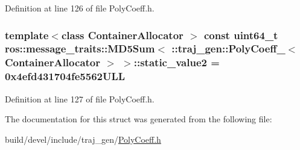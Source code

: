 Definition at line 126 of file Poly\+Coeff.\+h.

\subsubsection[{\texorpdfstring{static\+\_\+value2}{static_value2}}]{\setlength{\rightskip}{0pt plus 5cm}template$<$class Container\+Allocator $>$ const uint64\+\_\+t ros\+::message\+\_\+traits\+::\+M\+D5\+Sum$<$ \+::{\bf traj\+\_\+gen\+::\+Poly\+Coeff\+\_\+}$<$ Container\+Allocator $>$ $>$\+::static\+\_\+value2 = 0x4efd431704fe5562\+U\+LL\hspace{0.3cm}{\ttfamily [static]}}\hypertarget{structros_1_1message__traits_1_1_m_d5_sum_3_01_1_1traj__gen_1_1_poly_coeff___3_01_container_allocator_01_4_01_4_a50e4ac1d76e363847b992116a3400190}{}\label{structros_1_1message__traits_1_1_m_d5_sum_3_01_1_1traj__gen_1_1_poly_coeff___3_01_container_allocator_01_4_01_4_a50e4ac1d76e363847b992116a3400190}


Definition at line 127 of file Poly\+Coeff.\+h.



The documentation for this struct was generated from the following file\+:\begin{DoxyCompactItemize}
\item 
build/devel/include/traj\+\_\+gen/\hyperlink{_poly_coeff_8h}{Poly\+Coeff.\+h}\end{DoxyCompactItemize}
